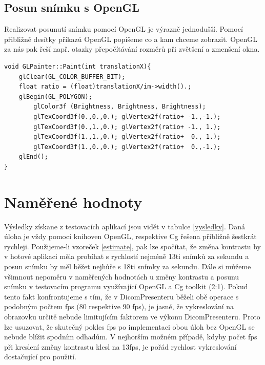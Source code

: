 \subsection{Posun snímku s OpenGL}

Realizovat posunutí snímku pomocí OpenGL je výrazně jednodušší. Pomocí přibližně desítky příkazů OpenGL popíšeme co a kam chceme zobrazit. OpenGL za nás pak řeší např. otazky přepočítávání rozměrů při zvětšení a zmenšení okna.

\begin{lstlisting}[caption={Funkce pro vykreslení snímku využívající OpenGL.}]
void GLPainter::Paint(int translationX){
	glClear(GL_COLOR_BUFFER_BIT);
	float ratio = (float)translationX/im->width().;
	glBegin(GL_POLYGON);
		glColor3f (Brightness, Brightness, Brightness);
		glTexCoord3f(0.,0.,0.);	glVertex2f(ratio+ -1.,-1.);
		glTexCoord3f(0.,1.,0.);	glVertex2f(ratio+ -1., 1.);
		glTexCoord3f(1.,1.,0.);	glVertex2f(ratio+  0., 1.);
		glTexCoord3f(1.,0.,0.);	glVertex2f(ratio+  0.,-1.);
	glEnd();
}
\end{lstlisting}




\section{Naměřené hodnoty}

Výsledky získane z testovacích aplikací jsou vidět v tabulce \ref{vysledky}. Daná úloha je vždy pomocí knihoven OpenGL, respektive Cg řešena přibližně šestkrát rychleji. Použijeme-li vzoreček \ref{estimate}, pak lze spočítat, že změna kontrastu by v hotové aplikaci měla probíhat s rychlostí nejméně 13ti snímků za sekundu a posun snímku by měl běžet nejhůře s 18ti snímky za sekundu. Dále si můžeme všimnout nepoměru v naměřených hodnotách u změny kontrastu a posunu snímku v testovacím programu využívající OpenGL a Cg toolkit (2:1). Pokud tento fakt konfrontujeme s tím, že v DicomPresenteru běželi obě operace s podobným počtem fps (80 respektive 90 fps), je jasné, že vykreslování na obrazovku určitě nebude limitujícím faktorem ve výkonu DicomPresenteru. Proto lze usuzovat, že skutečný pokles fps po implementaci obou úloh bez OpenGL se nebude blížit spodním odhadům. V nejhorším možném případě, kdyby počet fps při kreslení změny kontrastu klesl na 13fps, je pořád rychlost vykreslování dostačující pro použití.


